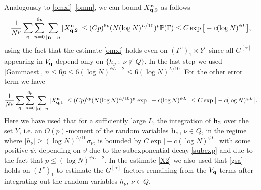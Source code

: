 \documentclass[draft]{article}
\newcommand{\ttau}{\vartheta}
\newcommand{\bq}{{\bf {q}}}
\newcommand{\bh}{{\bf{h}}}
\newcommand{\bn}{{\bf{n}}}
\newcommand{\sa}{{[\alpha ]}}
\newcommand{\al}{\alpha}
\newcommand{\be}{\begin{equation}}
\newcommand{\ee}{\end{equation}}
\renewcommand{\P}{{\mathbb P}}
\numberwithin{equation}{section}
\numberwithin{theorem}{section}
\numberwithin{definition}{section}
\numberwithin{remark}{section}
\begin{document}
 Analogously to \eqref{omxi}--\eqref{omm},
we can bound $X^\bn_{\bq,2}$ as follows 
\be\label{X1}
\frac{1}{N^p}\sum_\bq \sum_{n=0}^{6p}\sum_{|\bn|=n}
|X^\bn_{\bq,2}| \le (C p )^{6p}(N (\log N)^{L/10} )^{p} \P (\Gamma)
 \le  C\exp{\big[-c(\log N)^{\phi L} \big]},
\ee
using  the fact that the estimate
 \eqref{omxi} holds even on $ (\Gamma^c)_1 \times Y^c$
since all $G^{[\al]}$ appearing in $V_\bq$  depend
 only on $\{ h_\nu\; : \; \nu\not\in Q\}$.
 In the last step we used \eqref{Gammaest}, $n\le 6p \le 6(\log N)^{\phi L-2}\le 6 (\log N)^{L/10}$.
For the other error term we have
\be\label{X2}
\frac{1}{N^p}\sum_\bq \sum_{n=0}^{6p}\sum_{|\bn|=n}
|X^\bn_{\bq,1}| \le (C p )^{6p}(N (\log N)^{L/10} )^{p}  \, 
\exp{\big[-c(\log N)^{\psi L } \big]} \le  C\exp{\big[-c(\log N)^{\psi L } \big]}.
\ee
Here we have used that for a sufficiently large $L$, the integration of  $\bh_2$ over the set $Y$,
i.e. an $O(p)$-moment of the random variables $\bh_\nu$, $\nu\in Q$, in the
regime where $|h_\nu|\ge (\log N)^{L/10}\sigma_\nu$, 
 is bounded by  $ C\exp{\big[-c(\log N)^{\psi L} \big]}$ with some 
positive $\psi$, depending on $\ttau$ due to the subexponential decay 
\eqref{subexp}
 and due to the fact that
 $p\le (\log N)^{\psi L-2}$.
 In the estimate \eqref{X2} we also used that \eqref{gsa} holds on $(\Gamma^c)_1$ 
to estimate the $G^\sa$ factors remaining from the $V_\bq$ terms after
integrating out the random variables $h_\nu$, $\nu\in Q$. 
\end{document}
